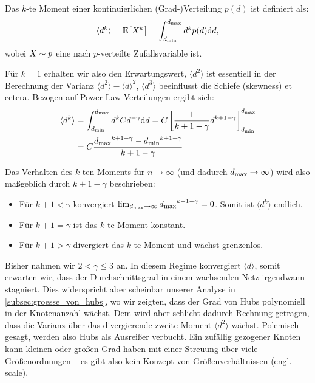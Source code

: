 Das $k$-te Moment einer kontinuierlichen (Grad-)Verteilung $p(d)$ ist definiert als:
\begin{equation}
    \langle d^k \rangle = \mathbb{E}\!\left[X^k\right] = \int_{{d_{\text{min}}}}^{{d_{\text{max}}}} d^k p(d) \text d d,
\end{equation}
wobei $X \sim p$ eine nach $p$-verteilte Zufallsvariable ist.

Für $k=1$ erhalten wir also den Erwartungswert, $\langle d^2 \rangle$ ist essentiell in der Berechnung der Varianz $\langle d^2 \rangle - \langle d \rangle^2$, $\langle d^3 \rangle$ beeinflusst die Schiefe (skewness) et cetera.
Bezogen auf Power-Law-Verteilungen ergibt sich:
\begin{align}
    \langle d^k \rangle
     & = \int_{{d_{\text{min}}}}^{{d_{\text{max}}}} d^k C d^{-\gamma} \text d d
    = C \left[ \frac{1}{k + 1 - \gamma} d^{k + 1 -\gamma}\right]_{{d_{\text{min}}}}^{{d_{\text{max}}}}    \\
     & = C \frac{{d_{\text{max}}}^{k + 1 -\gamma} - {d_{\text{min}}}^{k + 1 -\gamma}}{k + 1 - \gamma}
\end{align}

Das Verhalten des $k$-ten Moments für $n \to \infty$ (und dadurch ${d_{\text{max}}} \to \infty$) wird also maßgeblich durch $k + 1 - \gamma$ beschrieben:
\begin{itemize}
    \item Für $k + 1 < \gamma$ konvergiert $\lim_{{d_{\text{max}}} \to \infty} {d_{\text{max}}}^{k + 1 -\gamma} = 0$.
          Somit ist $\langle d^k \rangle$ endlich.

    \item Für $k + 1 = \gamma$ ist das $k$-te Moment konstant.

    \item Für $k + 1 > \gamma$ divergiert das $k$-te Moment und wächst grenzenlos.
\end{itemize}

\noindent
Bisher nahmen wir $2 < \gamma \le 3$ an.
In diesem Regime konvergiert $\langle d \rangle$, somit erwarten wir, dass der Durchschnittsgrad in einem wachsenden Netz irgendwann stagniert.
Dies widerspricht aber scheinbar unserer Analyse in \cref{subsec:groesse_von_hubs}, wo wir zeigten, dass der Grad von Hubs polynomiell in der Knotenanzahl wächst.
Dem wird aber schlicht dadurch Rechnung getragen, dass die Varianz über das divergierende zweite Moment $\langle d^2 \rangle$ wächst.
Polemisch gesagt, werden also Hubs als Ausreißer verbucht.
Ein zufällig gezogener Knoten kann kleinen oder großen Grad haben mit einer Streuung über viele Größenordnungen -- es gibt also kein Konzept von Größenverhältnissen (engl. scale).